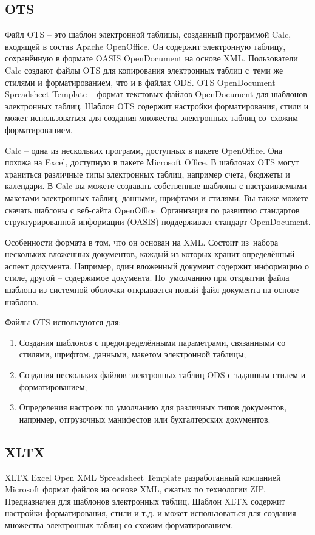 \documentclass{ou}
\begin{document}
\subsection{OTS}
Файл OTS -- это шаблон электронной таблицы, созданный программой Calc, входящей в состав Apache OpenOffice. Он содержит электронную таблицу, сохранённую в формате OASIS OpenDocument на основе XML. Пользователи Calc создают файлы OTS для копирования электронных таблиц с~теми же стилями и форматированием, что и в файлах ODS. OTS OpenDocument Spreadsheet Template -- формат текстовых файлов OpenDocument для шаблонов электронных таблиц. Шаблон OTS содержит настройки форматирования, стили и может использоваться для создания множества электронных таблиц со~схожим форматированием. 

Calc -- одна из нескольких программ, доступных в пакете OpenOffice. Она похожа на Excel, доступную в пакете Microsoft Office. В шаблонах OTS могут храниться различные типы электронных таблиц, например счета, бюджеты и календари. В Calc вы можете создавать собственные шаблоны с настраиваемыми макетами электронных таблиц, данными, шрифтами и стилями. Вы также можете скачать шаблоны с веб-сайта OpenOffice. Организация по развитию стандартов структурированной информации (OASIS) поддерживает стандарт OpenDocument.

Особенности формата в том, что он основан на XML. Состоит из~набора нескольких вложенных документов, каждый из которых хранит определённый аспект документа. Например, один вложенный документ содержит информацию о стиле, другой -- содержимое документа. По~умолчанию при открытии файла шаблона из системной оболочки открывается новый файл документа на основе шаблона.  

Файлы OTS используются для:
\begin{enumerate}[leftmargin=0em, itemindent=3.75em, nosep, label=\arabic*)]
\item Создания шаблонов с предопределёнными параметрами, связанными со стилями, шрифтом, данными, макетом электронной таблицы;
\item Создания нескольких файлов электронных таблиц ODS с заданным стилем и форматированием;
\item Определения настроек по умолчанию для различных типов документов, например, отгрузочных манифестов или бухгалтерских документов.
\end{enumerate}
\subsection{XLTX}
XLTX Excel Open XML Spreadsheet Template разработанный компанией Microsoft формат файлов на основе XML, сжатых по технологии ZIP. Предназначен для шаблонов электронных таблиц. Шаблон XLTX содержит настройки форматирования, стили и т.д. и может использоваться для создания множества электронных таблиц со схожим форматированием. 
\end{document}
